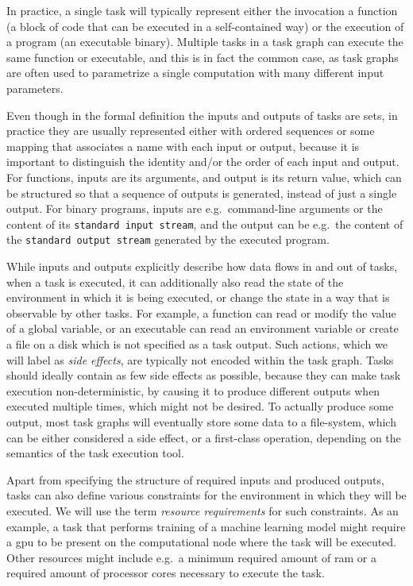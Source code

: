 In practice, a single task will typically represent either the invocation a function (a block of
code that can be executed in a self-contained way) or the execution of a program (an executable
binary). Multiple tasks in a task graph can execute the same function or executable, and this is in
fact the common case, as task graphs are often used to parametrize a single computation with many
different input parameters.

Even though in the formal definition the inputs and outputs of tasks are sets, in practice they are
usually represented either with ordered sequences or some mapping that associates a name with each
input or output, because it is important to distinguish the identity and/or the order of each input
and output. For functions, inputs are its arguments, and output is its return value, which can be
structured so that a sequence of outputs is generated, instead of just a single output. For binary
programs, inputs are e.g.\ command-line arguments or the content of its \texttt{standard input stream}, and
the output can be e.g.\ the content of the \texttt{standard output stream} generated by the executed
program.

While inputs and outputs explicitly describe how data flows in and out of tasks, when a task is
executed, it can additionally also read the state of the environment in which it is being executed,
or change the state in a way that is observable by other tasks. For example, a function can read or
modify the value of a global variable, or an executable can read an environment variable or create
a file on a disk which is not specified as a task output. Such actions, which we will label as
\emph{side effects}, are typically not encoded within the task graph. Tasks should ideally
contain as few side effects as possible, because they can make task execution non-deterministic, by
causing it to produce different outputs when executed multiple times, which might not be desired.
To actually produce some output, most task graphs will eventually store some data to a file-system,
which can be either considered a side effect, or a first-class operation, depending on the
semantics of the task execution tool.

Apart from specifying the structure of required inputs and produced outputs, tasks can also define
various constraints for the environment in which they will be executed. We will use the term
\emph{resource requirements} for such constraints. As an example, a task that performs training of a
machine learning model might require a \gls{gpu} to be present on the computational
node where the task will be executed. Other resources might include e.g.\ a minimum required amount
of \gls{ram} or a required amount of processor cores necessary to execute the task.

